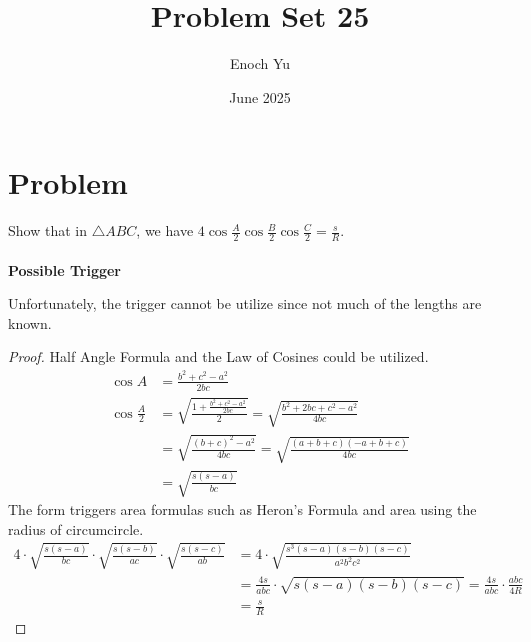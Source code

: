 \documentclass{article}
\title{Problem Set 25}
\author{Enoch Yu}
\date{June 2025}
\begin{document}
\section*{Problem}
Show that in $\triangle{ABC}$, we have $4\cos\frac{A}{2}\cos\frac{B}{2}\cos\frac{C}{2}=\frac{s}{R}$.
\\\\
\textbf{Possible Trigger}
\begin{center}
\end{center}
Unfortunately, the trigger cannot be utilize since not much of the lengths are known.
\begin{proof}
Half Angle Formula and the Law of Cosines could be utilized.
\begin{align*}
    \cos A &= \frac{b^2 + c^2 - a^2}{2bc} \\[0.5em]
    \cos\frac{A}{2}
    &= \sqrt{\frac{1 + \frac{b^2 + c^2 - a^2}{2bc}}{2}} = \sqrt{\frac{b^2 + 2bc + c^2 - a^2}{4bc}} \\[0.5em]
    &= \sqrt{\frac{(b + c)^2 - a^2}{4bc}} = \sqrt{\frac{(a + b + c)(-a + b + c)}{4bc}} \\[0.5em]
    &= \sqrt{\frac{s(s - a)}{bc}}
\end{align*}
The form triggers area formulas such as Heron's Formula and area using the radius of circumcircle.
\begin{align*}
    4 \cdot \sqrt{\frac{s(s - a)}{bc}} \cdot \sqrt{\frac{s(s - b)}{ac}} \cdot \sqrt{\frac{s(s - c)}{ab}}
    &= 4 \cdot \sqrt{\frac{s^3(s - a)(s - b)(s - c)}{a^2b^2c^2}} \\[0.5em]
    &= \frac{4s}{abc} \cdot \sqrt{s(s - a)(s - b)(s - c)} = \frac{4s}{abc} \cdot \frac{abc}{4R} \\[0.5em]
    &= \frac{s}{R}
\end{align*}
\end{proof}
\end{document}
